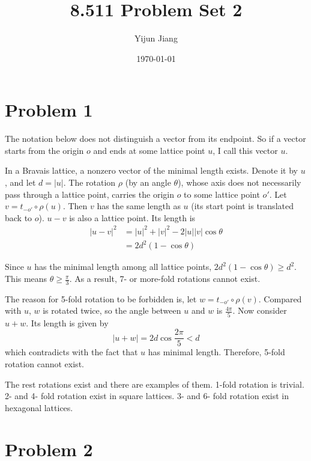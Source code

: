 \documentclass{article}
\title{8.511 Problem Set 2}
\author{Yijun Jiang}
\date{\today}
\begin{document}
\maketitle
\section{Problem 1}
The notation below does not distinguish a vector from its endpoint. So if a vector starts from the origin $o$ and ends at some lattice point $u$, I call this vector $u$.

In a Bravais lattice, a nonzero vector of the minimal length exists. Denote it by $u$, and let $d=|u|$. The rotation $\rho$ (by an angle $\theta$), whose axis does not necessarily pass through a lattice point, carries the origin $o$ to some lattice point $o'$. Let $v=t_{-o'}\circ\rho(u)$. Then $v$ has the same length as $u$ (its start point is translated back to $o$). $u-v$ is also a lattice point. Its length is
\begin{align*}
|u-v|^2&=|u|^2+|v|^2-2|u||v|\cos\theta\\
&=2d^2(1-\cos\theta)
\end{align*}

Since $u$ has the minimal length among all lattice points, $2d^2(1-\cos\theta)\geqslant d^2$. This means $\theta\geqslant\frac{\pi}{3}$. As a result, 7- or more-fold rotations cannot exist.

The reason for 5-fold rotation to be forbidden is, let $w=t_{-o'}\circ\rho(v)$. Compared with $u$, $w$ is rotated twice, so the angle between $u$ and $w$ is $\frac{4\pi}{5}$. Now consider $u+w$. Its length is given by
\begin{equation*}
|u+w|=2d\cos\frac{2\pi}{5}<d
\end{equation*}
which contradicts with the fact that $u$ has minimal length. Therefore, 5-fold rotation cannot exist.

The rest rotations exist and there are examples of them. 1-fold rotation is trivial. 2- and 4- fold rotation exist in square lattices. 3- and 6- fold rotation exist in hexagonal lattices.

\section{Problem 2}
\end{document}
